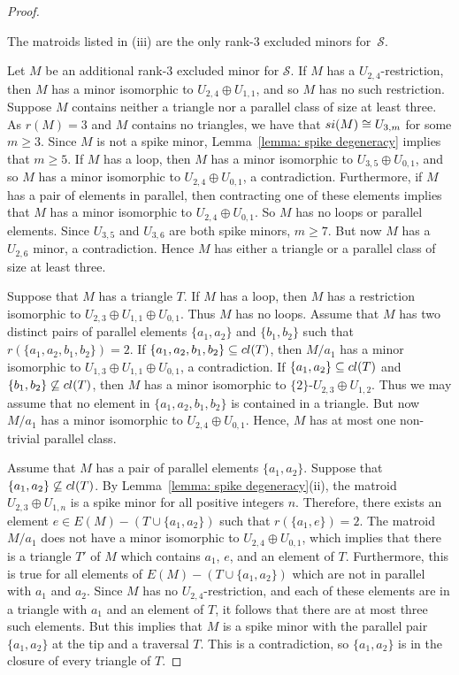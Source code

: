 \documentclass[10pt,a4paper]{amsart}
\newcommand{\cS}{\mathcal{S}}
\newcommand{\cl}{{\rm cl}}
\newcommand{\si}{{\rm si}}
\begin{document}
\begin{proof}
\begin{sublemma}
The matroids listed in (iii) are the only rank-$3$ excluded minors for~$\cS$.
\label{rank3}
\end{sublemma}

Let $M$ be an additional rank-$3$ excluded minor for $\cS$. If $M$ has a $U_{2, 4}$-restriction, then $M$ has a minor isomorphic to $U_{2, 4}\oplus U_{1, 1}$, and so $M$ has no such restriction. Suppose $M$ contains neither a triangle nor a parallel class of size at least three. As $r(M) = 3$ and $M$ contains no triangles, we have that $\si(M)\cong U_{3, m}$ for some $m\geq 3$. Since $M$ is not a spike minor, Lemma~\ref{lemma: spike degeneracy} implies that $m\geq 5$. If $M$ has a loop, then $M$ has a minor isomorphic to $U_{3, 5}\oplus U_{0,1}$, and so $M$ has a minor isomorphic to $U_{2, 4}\oplus U_{0, 1}$, a contradiction. Furthermore, if $M$ has a pair of elements in parallel, then contracting one of these elements implies that $M$ has a minor isomorphic to $U_{2, 4}\oplus U_{0, 1}$. So $M$ has no loops or parallel elements. Since $U_{3, 5}$ and $U_{3, 6}$ are both spike minors, $m\geq 7$. But now $M$ has a $U_{2, 6}$ minor, a contradiction. Hence $M$ has either a triangle or a parallel class of size at least three.

Suppose that $M$ has a triangle $T$. If $M$ has a loop, then $M$ has a restriction isomorphic to $U_{2, 3}\oplus U_{1, 1}\oplus U_{0, 1}$. Thus $M$ has no loops. Assume that $M$ has two distinct pairs of parallel elements $\{a_1, a_2\}$ and $\{b_1, b_2\}$ such that $r(\{a_1, a_2, b_1, b_2\}) = 2$. If $\{a_1, a_2, b_1, b_2\}\subseteq \cl(T)$, then $M/a_1$ has a minor isomorphic to $U_{1, 3}\oplus U_{1, 1}\oplus U_{0, 1}$, a contradiction. If $\{a_1, a_2\}\subseteq \cl(T)$ and $\{b_1, b_2\}\not\subseteq \cl(T)$, then $M$ has a minor isomorphic to $\{2\}$-$U_{2, 3}\oplus U_{1, 2}$. Thus we may assume that no element in $\{a_1, a_2, b_1, b_2\}$ is contained in a triangle. But now $M/ a_1$ has a minor isomorphic to $U_{2, 4}\oplus U_{0, 1}$. Hence, $M$ has at most one non-trivial parallel class.

Assume that $M$ has a pair of parallel elements $\{a_1, a_2\}$. Suppose that $\{a_1, a_2\}\not\subseteq \cl(T)$. By Lemma~\ref{lemma: spike degeneracy}(ii), the matroid $U_{2, 3}\oplus U_{1, n}$ is a spike minor for all positive integers $n$. Therefore, there exists an element $e\in E(M) - (T\cup \{a_1, a_2\})$ such that $r(\{a_1, e\})=2$. The matroid $M / a_1$ does not have a minor isomorphic to $U_{2,4} \oplus U_{0,1}$, which implies that there is a triangle $T'$ of $M$ which contains $a_1$, $e$, and an element of $T$. Furthermore, this is true for all elements of $E(M) - (T \cup \{a_1,a_2\})$ which are not in parallel with $a_1$ and $a_2$. Since $M$ has no $U_{2,4}$-restriction, and each of these elements are in a triangle with $a_1$ and an element of $T$, it follows that there are at most three such elements. But this implies that $M$ is a spike minor with the parallel pair $\{a_1,a_2\}$ at the tip and a traversal $T$. This is a contradiction, so $\{a_1,a_2\}$ is in the closure of every triangle of $T$.


\end{proof}
\end{document}
